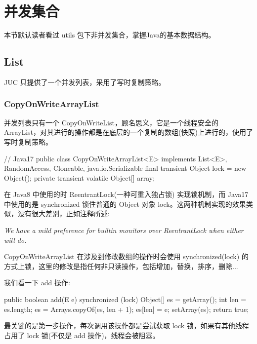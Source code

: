 \section{并发集合}

本节默认读者看过 utils 包下非并发集合，掌握Java的基本数据结构。

\subsection{List}

JUC 只提供了一个并发列表，采用了写时复制策略。

\subsubsection{CopyOnWriteArrayList}

并发列表只有一个 CopyOnWriteList，顾名思义，它是一个线程安全的 ArrayList，对其进行的操作都是在底层的一个复制的数组(快照)上进行的，使用了写时复制策略。

\begin{Java}
// Java17
public class CopyOnWriteArrayList<E> implements List<E>, RandomAccess, Cloneable, java.io.Serializable {
    final transient Object lock = new Object();
    private transient volatile Object[] array;
}
\end{Java}

在 Java8 中使用的时 ReentrantLock(一种可重入独占锁) 实现锁机制，而 Java17 中使用的是 synchronized 锁住普通的 Object 对象 lock。这两种机制实现的效果类似，没有很大差别，正如注释所述:

\begin{center}
\textit{We have a mild preference for builtin monitors over ReentrantLock when either will do.}
\end{center}

CopyOnWriteArrayList 在涉及到修改数组的操作时会使用 synchronized(lock) 的方式上锁，这里的修改是指任何非只读操作，包括增加，替换，排序，删除...

我们看一下 add 操作:

\begin{Java}
public boolean add(E e) {
    synchronized (lock) {
        Object[] es = getArray();
        int len = es.length;
        es = Arrays.copyOf(es, len + 1);
        es[len] = e;
        setArray(es);
        return true;
    }
}
\end{Java}

最关键的是第一步操作，每次调用该操作都是尝试获取 lock 锁，如果有其他线程占用了 lock 锁(不仅是 add 操作)，线程会被阻塞。

